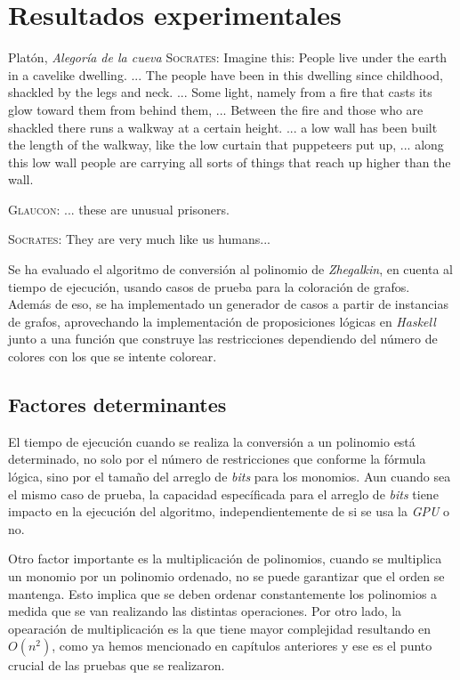 \chapter{Resultados experimentales}

\begin{chapquote}{Platón, \textit{Alegoría de la cueva}}
\textsc{Socrates}: Imagine this: People live under the earth in a cavelike dwelling. ... The people have been in this dwelling since childhood, shackled by the legs and neck. ... Some light, namely from a fire that casts its glow toward them from behind them, ... Between the fire and those who are shackled there runs a walkway at a certain height. ... a low wall has been built the length of the walkway, like the low curtain that puppeteers put up, ... along this low wall people are carrying all sorts of things that reach up higher than the wall.

\hspace{2em}\textsc{Glaucon}: ... these are unusual prisoners.

\hspace{2em}\textsc{Socrates}: They are very much like us humans...
\end{chapquote}

Se ha evaluado el algoritmo de conversión al polinomio de \textit{Zhegalkin}, en cuenta al tiempo de ejecución, usando casos de prueba para la coloración de grafos. Además de eso, se ha implementado un generador de casos a partir de instancias de grafos, aprovechando la implementación de proposiciones lógicas en \textit{Haskell} junto a una función que construye las restricciones dependiendo del número de colores con los que se intente colorear.

\section{Factores determinantes}

El tiempo de ejecución cuando se realiza la conversión a un polinomio está determinado, no solo por el número de restricciones que conforme la fórmula lógica, sino por el tamaño del arreglo de \textit{bits} para los monomios. Aun cuando sea el mismo caso de prueba, la capacidad específicada para el arreglo de \textit{bits} tiene impacto en la ejecución del algoritmo, independientemente de si se usa la \textit{GPU} o no.

Otro factor importante es la multiplicación de polinomios, cuando se multiplica un monomio por un polinomio ordenado, no se puede garantizar que el orden se mantenga. Esto implica que se deben ordenar constantemente los polinomios a medida que se van realizando las distintas operaciones. Por otro lado, la opearación de multiplicación es la que tiene mayor complejidad resultando en $O(n^2)$, como ya hemos mencionado en capítulos anteriores y ese es el punto crucial de las pruebas que se realizaron.


